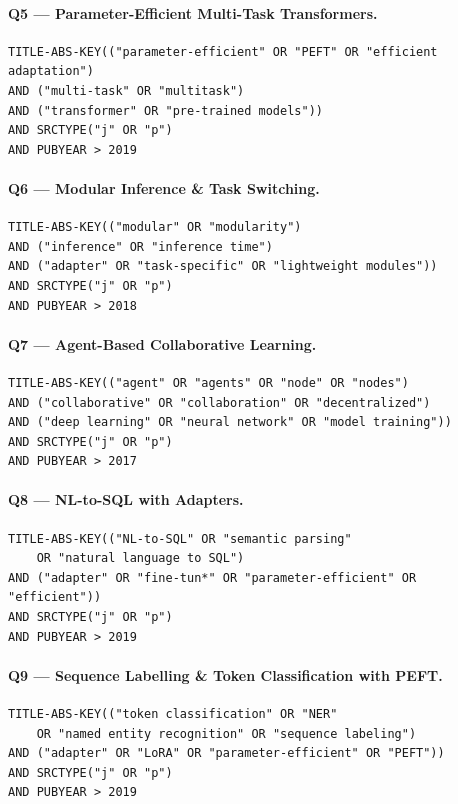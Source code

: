 \paragraph{Q5 — Parameter-Efficient Multi-Task Transformers.}
\begin{verbatim}
TITLE-ABS-KEY(("parameter-efficient" OR "PEFT" OR "efficient adaptation")
AND ("multi-task" OR "multitask")
AND ("transformer" OR "pre-trained models"))
AND SRCTYPE("j" OR "p")
AND PUBYEAR > 2019
\end{verbatim}

\paragraph{Q6 — Modular Inference \& Task Switching.}
\begin{verbatim}
TITLE-ABS-KEY(("modular" OR "modularity")
AND ("inference" OR "inference time")
AND ("adapter" OR "task-specific" OR "lightweight modules"))
AND SRCTYPE("j" OR "p")
AND PUBYEAR > 2018
\end{verbatim}

\paragraph{Q7 — Agent-Based Collaborative Learning.}
\begin{verbatim}
TITLE-ABS-KEY(("agent" OR "agents" OR "node" OR "nodes")
AND ("collaborative" OR "collaboration" OR "decentralized")
AND ("deep learning" OR "neural network" OR "model training"))
AND SRCTYPE("j" OR "p")
AND PUBYEAR > 2017
\end{verbatim}

\paragraph{Q8 — NL-to-SQL with Adapters.}
\begin{verbatim}
TITLE-ABS-KEY(("NL-to-SQL" OR "semantic parsing"
    OR "natural language to SQL")
AND ("adapter" OR "fine-tun*" OR "parameter-efficient" OR "efficient"))
AND SRCTYPE("j" OR "p")
AND PUBYEAR > 2019
\end{verbatim}

\paragraph{Q9 — Sequence Labelling \& Token Classification with PEFT.}
\begin{verbatim}
TITLE-ABS-KEY(("token classification" OR "NER"
    OR "named entity recognition" OR "sequence labeling")
AND ("adapter" OR "LoRA" OR "parameter-efficient" OR "PEFT"))
AND SRCTYPE("j" OR "p")
AND PUBYEAR > 2019
\end{verbatim}

